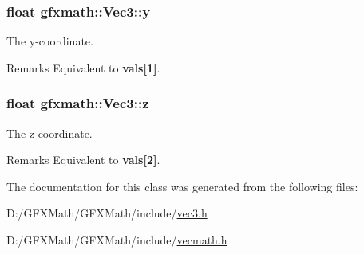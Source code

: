 \subsubsection[{y}]{\setlength{\rightskip}{0pt plus 5cm}float gfxmath\+::\+Vec3\+::y}\label{classgfxmath_1_1_vec3_a398bee406395fdc1ad381f5b70d7fd99}


The y-\/coordinate. 

\begin{DoxyRemark}{Remarks}
Equivalent to {\bfseries vals\mbox{[}1\mbox{]}}. 
\end{DoxyRemark}
\hypertarget{classgfxmath_1_1_vec3_a93c1920712889d4f10520c7dc76a79c7}{}
\subsubsection[{z}]{\setlength{\rightskip}{0pt plus 5cm}float gfxmath\+::\+Vec3\+::z}\label{classgfxmath_1_1_vec3_a93c1920712889d4f10520c7dc76a79c7}


The z-\/coordinate. 

\begin{DoxyRemark}{Remarks}
Equivalent to {\bfseries vals\mbox{[}2\mbox{]}}. 
\end{DoxyRemark}


The documentation for this class was generated from the following files\+:\begin{DoxyCompactItemize}
\item 
D\+:/\+G\+F\+X\+Math/\+G\+F\+X\+Math/include/\hyperlink{vec3_8h}{vec3.\+h}\item 
D\+:/\+G\+F\+X\+Math/\+G\+F\+X\+Math/include/\hyperlink{vecmath_8h}{vecmath.\+h}\end{DoxyCompactItemize}
